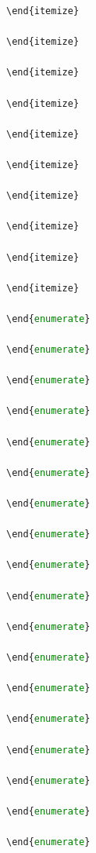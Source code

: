 \begin{itemize}
\begin{itemize}
\begin{itemize}
\begin{itemize}
\begin{itemize}
\begin{itemize}
\begin{enumerate}
\begin{enumerate}
\begin{enumerate}
\begin{enumerate}
\begin{lstlisting}[language=Python]
\end{itemize}

\end{itemize}

\end{itemize}

\end{itemize}

\end{itemize}

\end{itemize}

\end{itemize}

\end{itemize}

\end{itemize}

\end{itemize}

\end{enumerate}

\end{enumerate}

\end{enumerate}

\end{enumerate}

\end{enumerate}

\end{enumerate}

\end{enumerate}

\end{enumerate}

\end{enumerate}

\end{enumerate}

\end{enumerate}

\end{enumerate}

\end{enumerate}

\end{enumerate}

\end{enumerate}

\end{enumerate}

\end{enumerate}

\end{enumerate}


\end{lstlisting}
\end{enumerate}
\end{enumerate}
\end{enumerate}
\end{enumerate}
\end{itemize}
\end{itemize}
\end{itemize}
\end{itemize}
\end{itemize}
\end{itemize}
